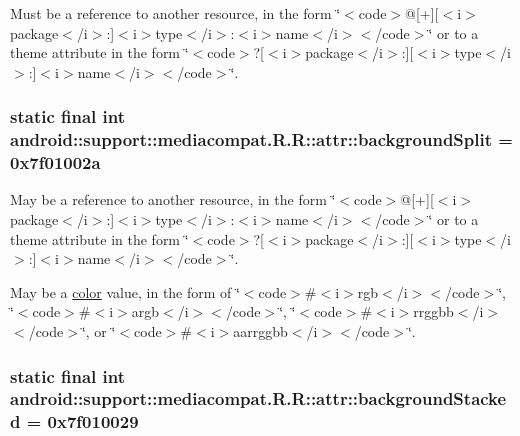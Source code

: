 Must be a reference to another resource, in the form \char`\"{}$<$code$>$@\mbox{[}+\mbox{]}\mbox{[}$<$i$>$package$<$/i$>$:\mbox{]}$<$i$>$type$<$/i$>$:$<$i$>$name$<$/i$>$$<$/code$>$\char`\"{} or to a theme attribute in the form \char`\"{}$<$code$>$?\mbox{[}$<$i$>$package$<$/i$>$:\mbox{]}\mbox{[}$<$i$>$type$<$/i$>$:\mbox{]}$<$i$>$name$<$/i$>$$<$/code$>$\char`\"{}. \hypertarget{classandroid_1_1support_1_1mediacompat_1_1_r_1_1attr_6e0344df3da561389baeb8ec9a571ce8}{
\subsubsection[{backgroundSplit}]{\setlength{\rightskip}{0pt plus 5cm}static final int android::support::mediacompat.R.R::attr::backgroundSplit = 0x7f01002a}}
\label{classandroid_1_1support_1_1mediacompat_1_1_r_1_1attr_6e0344df3da561389baeb8ec9a571ce8}


May be a reference to another resource, in the form \char`\"{}$<$code$>$@\mbox{[}+\mbox{]}\mbox{[}$<$i$>$package$<$/i$>$:\mbox{]}$<$i$>$type$<$/i$>$:$<$i$>$name$<$/i$>$$<$/code$>$\char`\"{} or to a theme attribute in the form \char`\"{}$<$code$>$?\mbox{[}$<$i$>$package$<$/i$>$:\mbox{]}\mbox{[}$<$i$>$type$<$/i$>$:\mbox{]}$<$i$>$name$<$/i$>$$<$/code$>$\char`\"{}. 

May be a \hyperlink{classandroid_1_1support_1_1mediacompat_1_1_r_1_1color}{color} value, in the form of \char`\"{}$<$code$>$\#$<$i$>$rgb$<$/i$>$$<$/code$>$\char`\"{}, \char`\"{}$<$code$>$\#$<$i$>$argb$<$/i$>$$<$/code$>$\char`\"{}, \char`\"{}$<$code$>$\#$<$i$>$rrggbb$<$/i$>$$<$/code$>$\char`\"{}, or \char`\"{}$<$code$>$\#$<$i$>$aarrggbb$<$/i$>$$<$/code$>$\char`\"{}. \hypertarget{classandroid_1_1support_1_1mediacompat_1_1_r_1_1attr_e67f58a70eca23cc43083ceb8066b342}{
\subsubsection[{backgroundStacked}]{\setlength{\rightskip}{0pt plus 5cm}static final int android::support::mediacompat.R.R::attr::backgroundStacked = 0x7f010029}}
\label{classandroid_1_1support_1_1mediacompat_1_1_r_1_1attr_e67f58a70eca23cc43083ceb8066b342}



